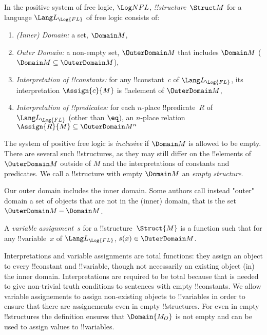 \documentclass[../../../include/open-logic-section]{subfiles}
\begin{document}
\begin{defn}[!!^{structure}s]
In the positive system of free logic, $\Log NFL$,
 \emph{!!{structure}}~$\Struct M$ for a language
$\Lang L_{\Log{FL}}$ of free logic consists of:
\begin{enumerate}
\item \emph{(Inner) Domain:} a set, $\Domain M$,
\item \emph{Outer Domain:} a non-empty set, $\OuterDomain M$ that
	includes $\Domain M$ ($\Domain M \subseteq \OuterDomain M $),
\item \emph{Interpretation of !!{constant}s:} for any !!{constant}~$c$ of
  $\Lang L_{\Log{FL}}$, its interpretation $\Assign{c}{M}$ is !!a{element} of 
  $\OuterDomain M$,
\item \emph{Interpretation of !!{predicate}s:} for each $n$-place
  !!{predicate}~$R$ of $\Lang L_{\Log{FL}}$ (other than $\eq$), an $n$-place
  relation $\Assign{R}{M} \subseteq \OuterDomain M^n$
\end{enumerate}
The system of positive free logic is \emph{inclusive} if $\Domain M$ is
allowed to be empty. There are several such !!{structure}s, as they may
still differ on the !!{element}s of $\OuterDomain M$ outside of $M$ and the 
interpretations of constants and predicates. We call a !!{structure} with
empty $\Domain M$ an \emph{empty structure}. 
\end{defn}

\begin{intro}
Our outer domain includes the inner domain. Some authors call instead "outer" 
domain a set of objects that are not in the (inner) domain, that is the set
$\OuterDomain M - \Domain M$.  
\end{intro}

\begin{defn}
A \emph{variable assignment}~$s$ for a !!{structure}~$\Struct{M}$ is a
  function such that for any !!{variable}~$x$ of
  $\Lang L_{\Log{FL}}$, $s(x) \in \OuterDomain M$. 
\end{defn}

\begin{explain}
Interpretations and variable assignments are total functions: they 
assign an object to every !!{constant} and !!{variable}, though 
not necessarily an existing object (in) the inner domain. Interpretations
are required to be total because that is needed to give non-trivial
truth conditions to sentences with empty !!{constant}s. We allow
variable assignements to assign non-existing objects to !!{variable}s in
order to ensure that there are assignements even in empty
 !!{structure}s. For even in empty !!{structure}s the definition ensures 
 that $\Domain{M_O}$ is not empty and can be used to assign values to
 !!{variable}s.
\end{explain}
\end{document}
